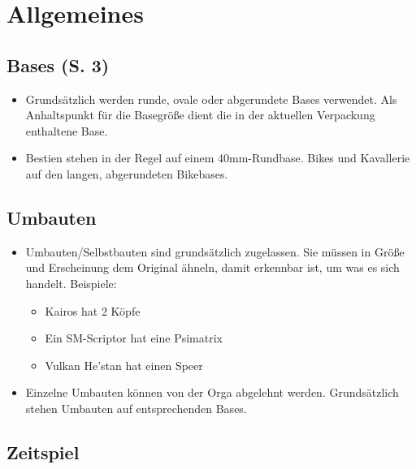 \section{Allgemeines} 

\subsection{Bases (S. 3)}

\begin{itemize}

 \item Grundsätzlich werden runde, ovale oder abgerundete Bases verwendet. Als
  Anhaltspunkt für die Basegröße dient die in der aktuellen Verpackung
  enthaltene Base.

\item Bestien stehen in der Regel auf einem 40mm-Rundbase. Bikes und Kavallerie
 auf den langen, abgerundeten Bikebases.

\end{itemize}

\subsection{Umbauten}

\begin{itemize}

 \item Umbauten/Selbstbauten sind grundsätzlich zugelassen. Sie müssen in Größe
  und Erscheinung dem Original ähneln, damit erkennbar ist, um was es sich
  handelt.
 Beispiele:
\begin{itemize}
 \item Kairos hat 2 Köpfe
 \item Ein SM-Scriptor hat eine Psimatrix
 \item Vulkan He'stan hat einen Speer
\end{itemize}

\item Einzelne Umbauten können von der Orga abgelehnt werden. Grundsätzlich
 stehen Umbauten  auf entsprechenden Bases.

\end{itemize}

\subsection{Zeitspiel}

